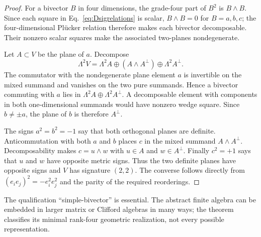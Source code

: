 \documentclass[11pt]{article}
\theoremstyle{definition}\newtheorem{definition}[theorem]{Definition}
\theoremstyle{remark}\newtheorem{remark}[theorem]{Remark}\newtheorem{conjecture}[theorem]{Conjecture}
\begin{document}
\begin{proof}
For a bivector $B$ in four dimensions, the grade-four part of $B^2$ is $B\wedge B$. Since each square in Eq.~\eqref{eq:Dsigrelations} is scalar, $B\wedge B=0$ for $B=a,b,c$; the four-dimensional Pl\"ucker relation therefore makes each bivector decomposable. Their nonzero scalar squares make the associated two-planes nondegenerate.

Let $A\subset V$ be the plane of $a$. Decompose
\begin{equation}
 \Lambda^2V=\Lambda^2A\oplus(A\wedge A^\perp)\oplus\Lambda^2A^\perp.
\end{equation}
The commutator with the nondegenerate plane element $a$ is invertible on the mixed summand and vanishes on the two pure summands. Hence a bivector commuting with $a$ lies in $\Lambda^2A\oplus\Lambda^2A^\perp$. A decomposable element with components in both one-dimensional summands would have nonzero wedge square. Since $b\neq\pm a$, the plane of $b$ is therefore $A^\perp$.

The signs $a^2=b^2=-1$ say that both orthogonal planes are definite. Anticommutation with both $a$ and $b$ places $c$ in the mixed summand $A\wedge A^\perp$. Decomposability makes $c=u\wedge w$ with $u\in A$ and $w\in A^\perp$. Finally $c^2=+1$ says that $u$ and $w$ have opposite metric signs. Thus the two definite planes have opposite signs and $V$ has signature $(2,2)$. The converse follows directly from $(e_ie_j)^2=-e_i^2e_j^2$ and the parity of the required reorderings.
\end{proof}

The qualification ``simple-bivector'' is essential. The abstract finite algebra can be embedded in larger matrix or Clifford algebras in many ways; the theorem classifies its minimal rank-four geometric realization, not every possible representation.
\end{document}
